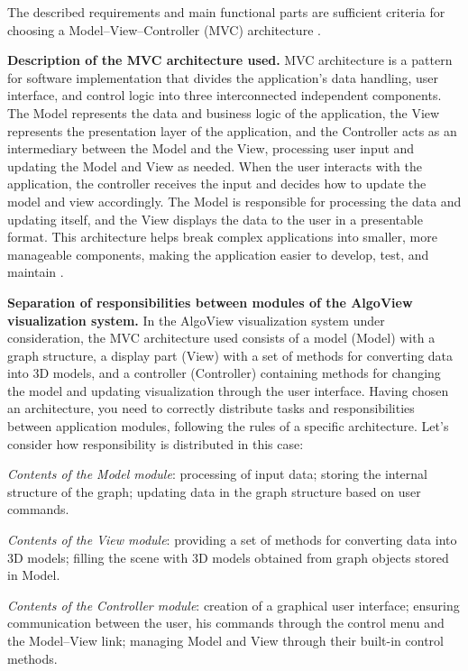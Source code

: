 The described requirements and main functional parts are sufficient criteria for choosing a Model--View--Controller (MVC) architecture \cite{m45}.

\textbf{Description of the MVC architecture used.} MVC architecture is a pattern for software implementation that divides the application's data handling, user interface, and control logic into three interconnected independent components. The Model represents the data and business logic of the application, the View represents the presentation layer of the application, and the Controller acts as an intermediary between the Model and the View, processing user input and updating the Model and View as needed. When the user interacts with the application, the controller receives the input and decides how to update the model and view accordingly. The Model is responsible for processing the data and updating itself, and the View displays the data to the user in a presentable format. This architecture helps break complex applications into smaller, more manageable components, making the application easier to develop, test, and maintain \cite{m46}.

\textbf{Separation of responsibilities between modules of the AlgoView visualization system.} In the AlgoView visualization system under consideration, the MVC architecture used consists of a model (Model) with a graph structure, a display part (View) with a set of methods for converting data into 3D models, and a controller (Controller) containing methods for changing the model and updating visualization through the user interface. Having chosen an architecture, you need to correctly distribute tasks and responsibilities between application modules, following the rules of a specific architecture. Let's consider how responsibility is distributed in this case:

\textit{Contents of the Model module}: processing of input data; storing the internal structure of the graph; updating data in the graph structure based on user commands.

\textit{Contents of the View module}: providing a set of methods for converting data into 3D models; filling the scene with 3D models obtained from graph objects stored in Model.

\textit{Contents of the Controller module}: creation of a graphical user interface; ensuring communication between the user, his commands through the control menu and the Model--View link; managing Model and View through their built-in control methods.